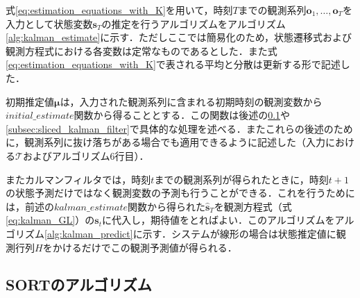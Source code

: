        式\ref{eq:estimation_equations_with_K}を用いて，時刻$T$までの観測系列$\bm{o}_1, \dots, \bm{o}_T$を入力として状態変数$\bm{s}_T$の推定を行うアルゴリズムをアルゴリズム\ref{alg:kalman_estimate}に示す．ただしここでは簡易化のため，状態遷移式および観測方程式における各変数は定常なものであるとした．また式\ref{eq:estimation_equations_with_K}で表される平均と分散は更新する形で記述した．
        
        初期推定値$\bm{\mu}$は，入力された観測系列に含まれる初期時刻の観測変数から$initial\_estimate$関数から得ることとする．この関数は後述の\ref{subsec:sort_algorithm}や\ref{subsec:sliced_kalman_filter}で具体的な処理を述べる．またこれらの後述のために，観測系列に抜け落ちがある場合でも適用できるように記述した（入力における$\mathcal{T}$およびアルゴリズム6行目）．

        またカルマンフィルタでは，時刻$t$までの観測系列が得られたときに，時刻$t+1$の状態予測だけではなく観測変数の予測も行うことができる．これを行うためには，前述の$kalman\_estimate$関数から得られた$\hat{\bm{s}}_T$を観測方程式（式\ref{eq:kalman_GL}）の$\bm{s}_t$に代入し，期待値をとればよい．このアルゴリズムをアルゴリズム\ref{alg:kalman_predict}に示す．システムが線形の場合は状態推定値に観測行列$H$をかけるだけでこの観測予測値が得られる．

    \subsection{SORTのアルゴリズム}
    \label{subsec:sort_algorithm}

